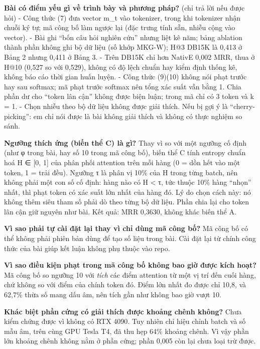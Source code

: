 \documentclass[11pt,a4paper]{article}
\begin{document}
\textbf{Bài có điểm yếu gì về trình bày và phương pháp?} (chỉ trả lời nếu được hỏi) - Công thức (7) đưa vector m\_t vào tokenizer, trong khi tokenizer nhận chuỗi ký tự; mã công bố làm ngược lại (đặc trưng tính sẵn, nhiễu cộng vào vector). - Bài ghi ``bốn câu hỏi nghiên cứu'' nhưng liệt kê năm; bảng ablation thành phần không ghi bộ dữ liệu (số khớp MKG-W); H@3 DB15K là 0,413 ở Bảng 2 nhưng 0,411 ở Bảng 3. - Trên DB15K chỉ hơn NativE 0,002 MRR, thua ở H@10 (0,527 so với 0,529), không có độ lệch chuẩn hay kiểm định thống kê, không báo cáo thời gian huấn luyện. - Công thức (9)(10) không nói phạt trước hay sau softmax; mã phạt trước softmax nên tổng xác suất vẫn bằng 1. Chia phần dư cho ``token lân cận'' không được biện luận; trong mã chỉ có 3 token và k = 1. - Chọn nhiễu theo bộ dữ liệu không được giải thích. Nếu bị gợi ý là ``cherry-picking'': em chỉ nói được là bài không giải thích và không có thực nghiệm so sánh.


\textbf{Ngưỡng thích ứng (biến thể C) là gì?} Thay vì so với một ngưỡng cố định (như φ trong bài, hay số 10 trong mã công bố), biến thể C tính entropy chuẩn hoá H ∈ [0, 1] của phân phối attention trên mỗi hàng (0 = dồn hết vào một token, 1 = trải đều). Ngưỡng τ là phân vị 10\% của H trong từng batch, nên không phải một con số cố định: hàng nào có H < τ, tức thuộc 10\% hàng ``nhọn'' nhất, thì phạt token có xác suất lớn nhất của hàng đó. Lý do chọn cách này: nó không thêm siêu tham số phải dò theo từng bộ dữ liệu. Phần chia lại cho token lân cận giữ nguyên như bài. Kết quả: MRR 0,3630, không khác biến thể A.


\textbf{Vì sao phải tự cài đặt lại thay vì chỉ dùng mã công bố?} Mã công bố có thể không phải phiên bản dùng để tạo số liệu trong bài. Cài đặt lại từ chính công thức của bài giúp kết luận không phụ thuộc vào repo.


\textbf{Vì sao điều kiện phạt trong mã công bố không bao giờ được kích hoạt?} Mã công bố so ngưỡng 10 với \emph{tích} các điểm attention từ một vị trí đến cuối hàng, chứ không so với điểm của chính token đó. Điểm lớn nhất đo được chỉ 10,8, và 62,7\% thừa số mang dấu âm, nên tích gần như không bao giờ vượt 10.


\textbf{Khác biệt phần cứng có giải thích được khoảng chênh không?} Chưa kiểm chứng được vì không có RTX 4090. Tuy nhiên chỉ hiệu chỉnh batch và số mẫu âm, trên cùng GPU Tesla T4, đã thu hẹp 64\% khoảng chênh. Vì vậy phần lớn khoảng chênh không nằm ở phần cứng; phần 0,005 còn lại chưa loại trừ được.
\end{document}
